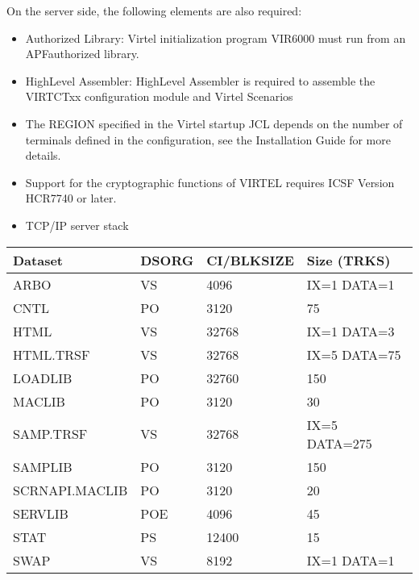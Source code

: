 \documentclass[letterpaper,10pt,english]{sphinxmanual}
\begin{document}
On the server side, the following elements are also required:
\begin{itemize}
\item {} 
Authorized Library: Virtel initialization program VIR6000 must run from an APF\sphinxhyphen{}authorized library.

\item {} 
High\sphinxhyphen{}Level Assembler: High\sphinxhyphen{}Level Assembler is required to assemble the VIRTCTxx configuration module and Virtel Scenarios

\item {} 
The REGION specified in the Virtel startup JCL depends on the number of terminals defined in the configuration, see the Installation Guide for more details.

\item {} 
Support for the cryptographic functions of VIRTEL requires ICSF Version HCR7740 or later.

\item {} 
TCP/IP server stack

\end{itemize}



\begin{savenotes}\sphinxattablestart
\centering
\begin{tabulary}{\linewidth}[t]{|T|T|T|T|}
\hline
\sphinxstyletheadfamily 
Dataset
&\sphinxstyletheadfamily 
DSORG
&\sphinxstyletheadfamily 
CI/BLKSIZE
&\sphinxstyletheadfamily 
Size (TRKS)
\\
\hline
ARBO
&
VS
&
4096
&
IX=1  DATA=1
\\
\hline
CNTL
&
PO
&
3120
&
75
\\
\hline
HTML
&
VS
&
32768
&
IX=1  DATA=3
\\
\hline
HTML.TRSF
&
VS
&
32768
&
IX=5  DATA=75
\\
\hline
LOADLIB
&
PO
&
32760
&
150
\\
\hline
MACLIB
&
PO
&
3120
&
30
\\
\hline
SAMP.TRSF
&
VS
&
32768
&
IX=5  DATA=275
\\
\hline
SAMPLIB
&
PO
&
3120
&
150
\\
\hline
SCRNAPI.MACLIB
&
PO
&
3120
&
20
\\
\hline
SERVLIB
&
PO\sphinxhyphen{}E
&
4096
&
45
\\
\hline
STAT
&
PS
&
12400
&
15
\\
\hline
SWAP
&
VS
&
8192
&
IX=1  DATA=1
\\
\hline
\end{tabulary}
\par
\sphinxattableend\end{savenotes}
\end{document}
